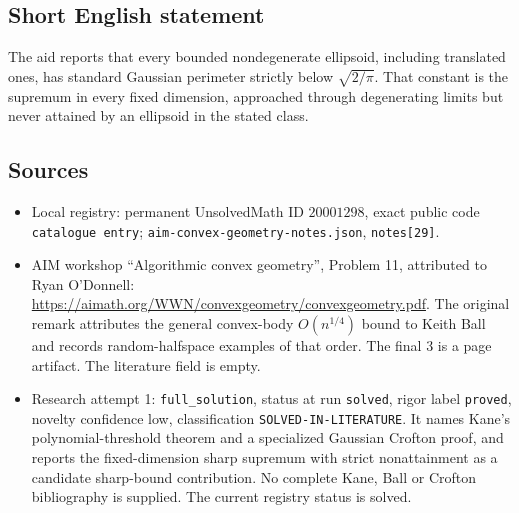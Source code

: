 \documentclass[11pt]{article}
\begin{document}
\subsection{Short English statement}
The aid reports that every bounded nondegenerate ellipsoid, including translated ones, has standard Gaussian perimeter strictly below \(\sqrt{2/\pi}\). That constant is the supremum in every fixed dimension, approached through degenerating limits but never attained by an ellipsoid in the stated class.
\subsection{Sources}
\begin{itemize}
\item Local registry: permanent UnsolvedMath ID \(20001298\), exact public code \texttt{catalogue entry}; \texttt{aim-convex-geometry-notes.json}, \texttt{notes[29]}.
\item AIM workshop ``Algorithmic convex geometry'', Problem 11, attributed to Ryan O'Donnell: \url{https://aimath.org/WWN/convexgeometry/convexgeometry.pdf}. The original remark attributes the general convex-body \(O(n^{1/4})\) bound to Keith Ball and records random-halfspace examples of that order. The final 3 is a page artifact. The literature field is empty.
\item Research attempt 1: \texttt{full\_solution}, status at run \texttt{solved}, rigor label \texttt{proved}, novelty confidence low, classification \texttt{SOLVED-IN-LITERATURE}. It names Kane's polynomial-threshold theorem and a specialized Gaussian Crofton proof, and reports the fixed-dimension sharp supremum with strict nonattainment as a candidate sharp-bound contribution. No complete Kane, Ball or Crofton bibliography is supplied. The current registry status is solved.
\end{itemize}
\end{document}
